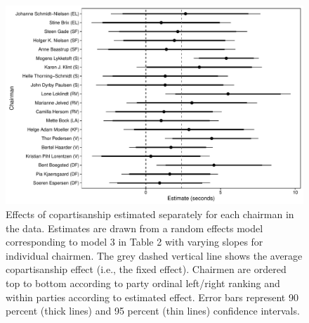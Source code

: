 \documentclass[12pt,a4paper]{article}
\begin{document}
\begin{figure}[!h]
\centering
\includegraphics[scale=.55]{../figures/parlbias_chairranefs}
  \caption{Effects of copartisanship estimated separately for each chairman in the data. Estimates are drawn from a random effects model corresponding to model 3 in Table 2 with varying slopes for individual chairmen. The grey dashed vertical line shows the average copartisanship effect (i.e., the fixed effect). Chairmen are ordered top to bottom according to party ordinal left/right ranking and within parties according to estimated effect. Error bars represent 90 percent (thick lines) and 95 percent (thin lines) confidence intervals.}\label{parlbias_chairranfefs}
\end{figure}
\end{document}
